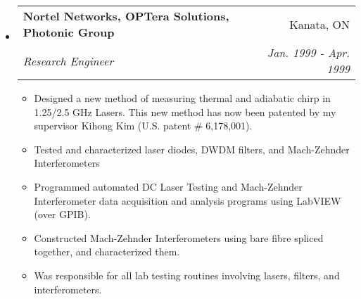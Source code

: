 \documentclass[letterpaper,11pt]{article}
\makeatletter
\newcommand{\resitem}[1]{\item #1 \vspace{-2pt}}
\newcommand{\ressubheading}[4]{
\begin{tabular*}{6.5in}{l@{\extracolsep{\fill}}r}
		\textbf{#1} & #2 \\
		\textit{#3} & \textit{#4} \\
\end{tabular*}\vspace{-6pt}}
\makeatother
\begin{document}
\begin{itemize}
\item
	\ressubheading{Nortel Networks, OPTera Solutions, Photonic Group}{Kanata, ON}{Research Engineer}{Jan. 1999 - Apr. 1999}
	\begin{itemize}
		\resitem{Designed a new method of measuring thermal and adiabatic chirp in 1.25/2.5 GHz Lasers.  This new method has now been patented by my supervisor Kihong Kim (U.S. patent \# 6,178,001).}
		\resitem{Tested and characterized laser diodes, DWDM filters, and Mach-Zehnder Interferometers}
		\resitem{Programmed automated DC Laser Testing and Mach-Zehnder Interferometer data acquisition and analysis programs using LabVIEW (over GPIB).}
		\resitem{Constructed Mach-Zehnder Interferometers using bare fibre spliced together, and characterized them.}
		\resitem{Was responsible for all lab testing routines involving lasers, filters, and interferometers.}
	\end{itemize}
\end{itemize}
\end{document}
